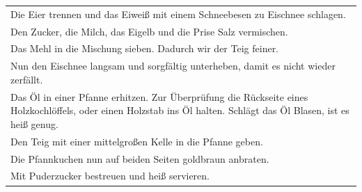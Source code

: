 \begin{tabular}{p{15cm}}
	\\
	Die Eier trennen und das Eiweiß mit einem Schneebesen zu Eischnee schlagen.\\
	Den Zucker, die Milch, das Eigelb und die Prise Salz vermischen.\\
	Das Mehl in die Mischung sieben. Dadurch wir der Teig feiner.\\
	Nun den Eischnee langsam und sorgfältig unterheben, damit es nicht wieder zerfällt.\\
	Das Öl in einer Pfanne erhitzen. Zur Überprüfung die Rückseite eines Holzkochlöffels, oder einen Holzstab ins Öl halten. Schlägt das Öl Blasen, ist es heiß genug.\\
	Den Teig mit einer mittelgroßen Kelle in die Pfanne geben.\\
	Die Pfannkuchen nun auf beiden Seiten goldbraun anbraten.\\
	Mit Puderzucker bestreuen und heiß servieren.
\end{tabular}
